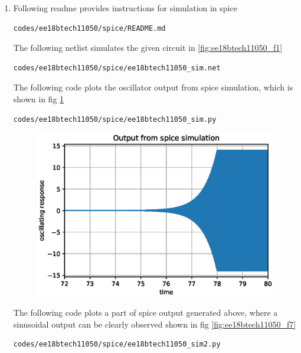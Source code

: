 \begin{enumerate}[label=\arabic*.,ref=\theenumi]
\item \solution Following readme provides instructions for simulation in spice

\begin{lstlisting}
codes/ee18btech11050/spice/README.md
\end{lstlisting}

The following netlist simulates the given circuit in \ref{fig:ee18btech11050_f1}

\begin{lstlisting}
codes/ee18btech11050/spice/ee18btech11050_sim.net
\end{lstlisting}

The following code plots the oscillator output from spice simulation, which is shown in fig \ref{fig:ee18btech11050_f6}

\begin{lstlisting}
codes/ee18btech11050/spice/ee18btech11050_sim.py
\end{lstlisting}

\begin{figure}[!ht]
\centering
\includegraphics[width=\columnwidth]{./figs/ee18btech11050/ee18btech11050_sim.eps}
\caption{}
\label{fig:ee18btech11050_f6}
\end{figure}

The following code plots a part of spice output generated above, where a sinusoidal output can be clearly observed shown in fig \ref{fig:ee18btech11050_f7}

\begin{lstlisting}
codes/ee18btech11050/spice/ee18btech11050_sim2.py
\end{lstlisting}


\end{enumerate}
